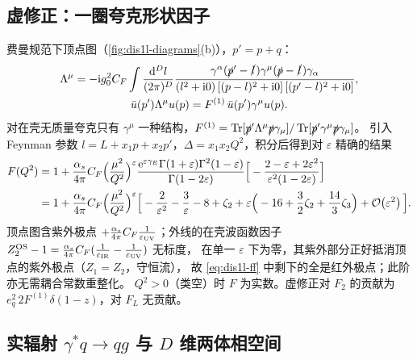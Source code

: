 \subsection{虚修正：一圈夸克形状因子}

费曼规范下顶点图（\cref{fig:dis1l-diagrams}(b)），$p'=p+q$：
\begin{gather}
\Lambda^\mu=-\mathrm{i} g_0^2C_F\int\frac{\mathrm{d}^Dl}{(2\pi)^D}
\frac{\gamma^\alpha(\slashed{p}'-\slashed{l})\gamma^\mu(\slashed{p}-\slashed{l})\gamma_\alpha}{(l^2+\mathrm{i}0)\,[(p-l)^2+\mathrm{i}0]\,[(p'-l)^2+\mathrm{i}0]},
\nonumber\\
\bar u(p')\Lambda^\mu u(p)=F^{(1)}\,\bar u(p')\gamma^\mu u(p).
\end{gather}
对在壳无质量夸克只有 $\gamma^\mu$ 一种结构，$F^{(1)}=\operatorname{Tr}[\slashed{p}'\Lambda^\mu\slashed{p}\gamma_\mu]/\operatorname{Tr}[\slashed{p}'\gamma^\mu\slashed{p}\gamma_\mu]$。
引入 Feynman 参数 $l=L+x_1p+x_2p'$，$\Delta=x_1x_2Q^2$，积分后得到对 $\varepsilon$ 精确的结果
\begin{align}
F(Q^2)&=1+\frac{\alpha_s}{4\pi}C_F\Big(\frac{\mu^2}{Q^2}\Big)^{\varepsilon}
\frac{\mathrm{e}^{\varepsilon\gamma_E}\Gamma(1+\varepsilon)\Gamma^2(1-\varepsilon)}{\Gamma(1-2\varepsilon)}
\Big[-\frac{2-\varepsilon+2\varepsilon^2}{\varepsilon^2(1-2\varepsilon)}\Big]\label{eq:dis1l-ff}\\
&=1+\frac{\alpha_s}{4\pi}C_F\Big(\frac{\mu^2}{Q^2}\Big)^{\varepsilon}
\Big[-\frac{2}{\varepsilon^2}-\frac{3}{\varepsilon}-8+\zeta_2+\varepsilon\Big(-16+\frac32\zeta_2+\frac{14}{3}\zeta_3\Big)+\mathcal{O}\!\left(\varepsilon^2\right)\Big].
\nonumber
\end{align}
顶点图含紫外极点 $+\frac{\alpha_s}{4\pi}C_F\frac{1}{\varepsilon_{\rm UV}}$；外线的在壳波函数因子
$Z_2^{\rm OS}-1=\frac{\alpha_s}{4\pi}C_F(\frac{1}{\varepsilon_{\rm IR}}-\frac{1}{\varepsilon_{\rm UV}})$ 无标度，
在单一 $\varepsilon$ 下为零，其紫外部分正好抵消顶点的紫外极点（$Z_1=Z_2$，守恒流），
故 \cref{eq:dis1l-ff} 中剩下的全是红外极点；此阶亦无需耦合常数重整化。
$Q^2>0$（类空）时 $F$ 为实数。虚修正对 $F_2$ 的贡献为 $e_q^2\,2F^{(1)}\delta(1-z)$，对 $F_L$ 无贡献。

\subsection{实辐射 \texorpdfstring{$\gamma^*q\to qg$}{gamma* q -> q g} 与 \texorpdfstring{$D$}{D} 维两体相空间}

